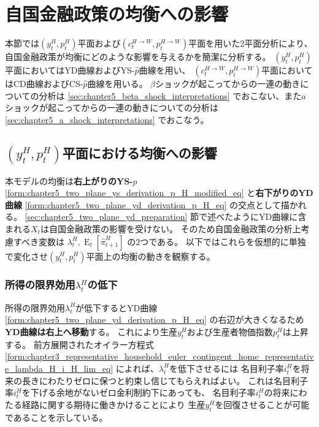 
\section{自国金融政策の均衡への影響}
\label{sec:chapter5_two_plane_equilibrium}
本節では\((y_t^H,p_t^H)\)平面および\((c_t^{H\to W},p_t^{H\to W})\)平面を用いた2平面分析により、
自国金融政策が均衡にどのような影響を与えるかを簡潔に分析する。
\((y_t^H,p_t^H)\)平面においてはYD曲線およびYS-\(\hat{p}\)曲線を用い、
\((c_t^{H\to W},p_t^{H\to W})\)平面においてはCD曲線およびCS-\(\hat{p}\)曲線を用いる。
\(\beta\)ショックが起こってからの一連の動きについての分析は
\ref{sec:chapter5_beta_shock_interpretations}
でおこない、また\(a\)ショックが起こってからの一連の動きについての分析は
\ref{sec:chapter5_a_shock_interpretations}
でおこなう。

\subsection{\((y_t^H,p_t^H)\)平面における均衡への影響}
\label{sec:chapter5_two_plane_equilibrium_ysyd}
本モデルの均衡は\textbf{右上がりのYS-\(\hat{p}\)}
\eqref{form:chapter5_two_plane_ys_derivation_p_H_modified_eq}
と\textbf{右下がりのYD曲線}
\eqref{form:chapter5_two_plane_yd_derivation_p_H_eq}
の交点として描かれる。
\ref{sec:chapter5_two_plane_yd_preparation}
節で述べたようにYD曲線に含まれる\(X_t\)は自国金融政策の影響を受けない。
そのため自国金融政策の分析上考慮すべき変数は
\(\lambda_t^H,\operatorname{E}_t[\hat{\pi}_{t+1}^H]\)
の2つである。
以下ではこれらを仮想的に単独で変化させ\((y_t^H,p_t^H)\)平面上の均衡の動きを観察する。

\subsubsection{所得の限界効用\(\lambda_t^H\)の低下}
\label{sec:chapter5_two_plane_equilibrium_ysyd_lambda_H_fall}
所得の限界効用\(\lambda_t^H\)が低下するとYD曲線
\eqref{form:chapter5_two_plane_yd_derivation_p_H_eq}
の右辺が大きくなるため\textbf{YD曲線は右上へ移動}する。
これにより生産\(y_t^H\)および生産者物価指数\(p_t^H\)は上昇する。
前方展開されたオイラー方程式
\eqref{form:chapter3_representative_household_euler_contingent_home_representative_lambda_H_i_H_lim_eq}
によれば、\(\lambda_t^H\)を低下させるには
名目利子率\(i_t^H\)を将来の長きにわたりゼロに保つと約束し信じてもらえればよい。
これは名目利子率\(i_t^H\)を下げる余地がないゼロ金利制約下にあっても、
名目利子率\(i_t^H\)の将来にわたる経路に関する期待に働きかけることにより
生産\(y_t^H\)を回復させることが可能であることを示している。

